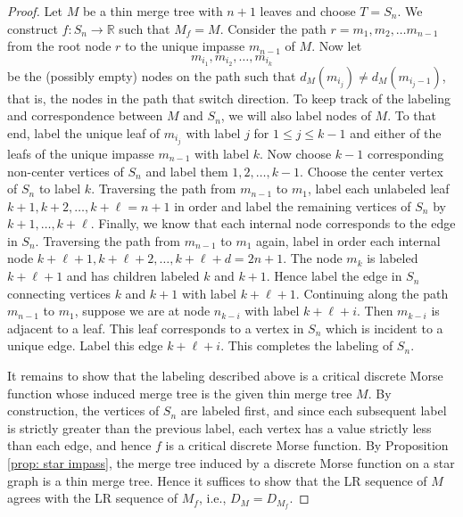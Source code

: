 \documentclass{article}
\theoremstyle{definition}
\newcommand{\RR}    {\mathbb{R}}
\begin{document}
\begin{proof}
Let $M$ be a thin merge tree with $n+1$ leaves and choose $T = S_n$.  We construct $f\colon S_n \to \RR$ such that $M_f = M$.  Consider the path $r=m_1, m_2, \ldots m_{n-1}$ from the root node $r$ to the unique impasse $m_{n-1}$ of $M$.  Now let
\begin{equation} \label{eq:1}
m_{i_1}, m_{i_2}, \ldots, m_{i_k}
\end{equation}
\noindent be the (possibly empty) nodes on the path such that $d_M(m_{i_j})\neq d_M(m_{i_j-1})$, that is, the nodes in the path that switch direction.  To keep track of the labeling and correspondence between $M$ and $S_n$, we will also label nodes of $M$. To that end, label the unique leaf of $m_{i_j}$ with label $j$ for $1\leq j \leq k-1$ and either of the leafs of the unique impasse $m_{n-1}$ with label $k$. Now choose $k-1$ corresponding non-center vertices of $S_n$ and label them $1,2, \ldots, k-1$. Choose the center vertex of $S_n$ to label $k$.  Traversing the path from $m_{n-1}$ to $m_1$, label each unlabeled leaf $k+1, k+2, \ldots, k+\ell=n+1$ in order and label the remaining vertices of $S_n$ by $k+1, \ldots, k+\ell$. Finally, we know that each internal node corresponds to the edge in $S_n$.  Traversing the path from $m_{n-1}$ to $m_1$ again, label in order each internal node $k+\ell+1, k+\ell+2, \ldots, k+\ell+d=2n+1$. The node $m_k$ is labeled $k+\ell+1$ and has children labeled $k$ and $k+1$.  Hence label the edge in $S_n$ connecting vertices $k$ and $k+1$ with label $k+\ell+1$. Continuing along the path $m_{n-1}$ to $m_1$, suppose we are at node $n_{k-i}$ with label $k+\ell+i$.  Then $m_{k-i}$ is adjacent to a leaf.  This leaf corresponds to a vertex in $S_n$ which is incident to a unique edge.  Label this edge $k+\ell+i$.  This completes the labeling of $S_n$.

It remains to show that the labeling described above is a critical discrete Morse function whose induced merge tree is the given thin merge tree $M$.  By construction, the vertices of $S_n$  are labeled first, and since each subsequent label is strictly greater than the previous label, each vertex has a value strictly less than each edge, and hence $f$ is a critical discrete Morse function. By Proposition \ref{prop: star impass}, the merge tree induced by a discrete Morse function on a star graph is a thin merge tree.  Hence it suffices to show that the LR sequence of $M$ agrees with the LR sequence of $M_f$, i.e., $D_M=D_{M_f}$.


\end{proof}
\end{document}
